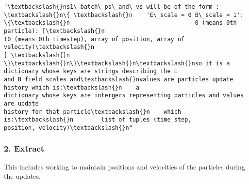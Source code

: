 \documentclass[11pt]{article}
\makeatletter
\newcommand{\boxspacing}{\kern\kvtcb@left@rule\kern\kvtcb@boxsep}
\newcommand{\prompt}[4]{
        {\ttfamily\llap{{\color{#2}[#3]:\hspace{3pt}#4}}\vspace{-\baselineskip}}
    }
\makeatother
\begin{document}
            \begin{tcolorbox}[breakable, size=fbox, boxrule=.5pt, pad at break*=1mm, opacityfill=0]
\prompt{Out}{outcolor}{6}{\boxspacing}
\begin{Verbatim}[commandchars=\\\{\}]
"\textbackslash{}ns1\_batch\_ps\_and\_vs will be of the form : \textbackslash{}n\{ \textbackslash{}n    'E\_scale = 0 B\_scale = 1':
\{\textbackslash{}n                                    0 (means 0th particle): [\textbackslash{}n
(0 (means 0th timestep), array of position, array of velocity)\textbackslash{}n
] \textbackslash{}n    \}\textbackslash{}n\}\textbackslash{}n\textbackslash{}nso it is a dictionary whose keys are strings describing the E
and B field scales and\textbackslash{}nvalues are particles update history which is:\textbackslash{}n    a
dictionary whose keys are intergers representing particles and values are update
history for that particle\textbackslash{}n    which is:\textbackslash{}n        list of tuples (time step,
position, velocity)\textbackslash{}n"
\end{Verbatim}
\end{tcolorbox}
        
    \hypertarget{extract}{%
\subsubsection{2. Extract}\label{extract}}

This includes working to maintain positions and velocities of the
particles during the updates.
\end{document}
